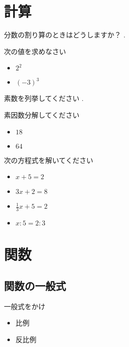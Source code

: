 \documentclass[10pt]{jsarticle}
\begin{document}
\section{計算}
\begin{itembox}[l]{分数の割り算のときはどうしますか？}
	.\\[10mm]
\end{itembox}
\begin{itembox}[l]{次の値を求めなさい}
	\begin{Large}
		\begin{itemize}
			\item $2^2$
			\item $(-3)^3$
		\end{itemize}
	\end{Large}
\end{itembox}
\begin{itembox}[l]{素数を列挙してください}
	.\\[10mm]
\end{itembox}
\begin{itembox}[l]{素因数分解してください}
	\begin{Large}
		\begin{itemize}
			\item $18$
			\item $64$
		\end{itemize}
	\end{Large}
\end{itembox}
\begin{itembox}[l]{次の方程式を解いてください}
	\begin{Large}
		\begin{itemize}
			\item $x+5=2$
			\item $3x+2=8$
			      \item$\frac{1}{3}x+5=2$
			\item $x:5=2:3$
		\end{itemize}
	\end{Large}
\end{itembox}



\section{関数}
\subsection{関数の一般式}
\begin{itembox}[l]{一般式をかけ}
	\begin{Large}
		\begin{itemize}
			\item 比例
			\item 反比例
		\end{itemize}
	\end{Large}
\end{itembox}
\end{document}
